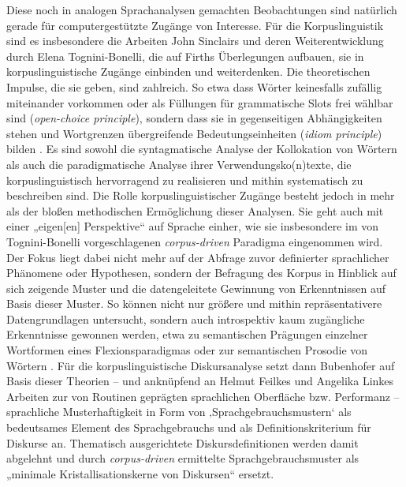 Diese noch in analogen Sprachanalysen gemachten Beobachtungen sind natürlich gerade für computergestützte Zugänge von Interesse. Für die Korpuslinguistik sind es insbesondere die Arbeiten John Sinclairs und deren Weiterentwicklung durch Elena Tognini-Bonelli, die auf Firths Überlegungen aufbauen, sie in korpuslinguistische Zugänge einbinden und weiterdenken. Die theoretischen Impulse, die sie geben, sind zahlreich. So etwa dass Wörter keinesfalls zufällig miteinander vorkommen oder als Füllungen für grammatische Slots frei wählbar sind (\emph{open-choice principle}), sondern dass sie in gegenseitigen Abhängigkeiten stehen und Wortgrenzen übergreifende Bedeutungseinheiten (\emph{idiom principle}) bilden \autocite{sinclairCorpusConcordanceCollocation1991}. Es sind sowohl die syntagmatische Analyse der Kollokation von Wörtern als auch die paradigmatische Analyse ihrer Verwendungsko(n)texte, die korpuslinguistisch hervorragend zu realisieren und mithin systematisch zu beschreiben sind. Die Rolle korpuslinguistischer Zugänge besteht jedoch in mehr als der bloßen methodischen Ermöglichung dieser Analysen. Sie geht auch mit einer „eigen{[}en{]} Perspektive`` \autocite[2]{perkuhnKorpuslinguistikUnbekannteWesen2006} auf Sprache einher, wie sie insbesondere im von Tognini-Bonelli \autocite*{tognini-bonelliCorpusLinguisticsWork2001} vorgeschlagenen \emph{corpus-driven} Paradigma eingenommen wird. Der Fokus liegt dabei nicht mehr auf der Abfrage zuvor definierter sprachlicher Phänomene oder Hypothesen, sondern der Befragung des Korpus in Hinblick auf sich zeigende Muster und die datengeleitete Gewinnung von Erkenntnissen auf Basis dieser Muster. So können nicht nur größere und mithin repräsentativere Datengrundlagen untersucht, sondern auch introspektiv kaum zugängliche Erkenntnisse gewonnen werden, etwa zu semantischen Prägungen einzelner Wortformen eines Flexionsparadigmas \autocites{sinclairCorpusConcordanceCollocation1991}[92-99]{tognini-bonelliCorpusLinguisticsWork2001} oder zur semantischen Prosodie von Wörtern \autocite[111-116]{tognini-bonelliCorpusLinguisticsWork2001}. Für die korpuslinguistische Diskursanalyse setzt dann Bubenhofer \autocite*{bubenhoferSprachgebrauchsmusterKorpuslinguistikAls2009} auf Basis dieser Theorien -- und anknüpfend an Helmut Feilkes und Angelika Linkes Arbeiten zur von Routinen geprägten sprachlichen Oberfläche bzw. Performanz \autocite{feilkeTextroutineTextsemantikUnd2003, feilkeOberflaecheUndPerformanz2009} -- sprachliche Musterhaftigkeit in Form von ‚Sprachgebrauchsmustern` als bedeutsames Element des Sprachgebrauchs und als Definitionskriterium für Diskurse an. Thematisch ausgerichtete Diskursdefinitionen werden damit abgelehnt und durch \emph{corpus-driven} ermittelte Sprachgebrauchsmuster als „minimale Kristallisationskerne von Diskursen`` \autocite[40]{linkeBegriffsgeschichteDiskursgeschichteSprachgebrauchsgeschichte2003} ersetzt.

